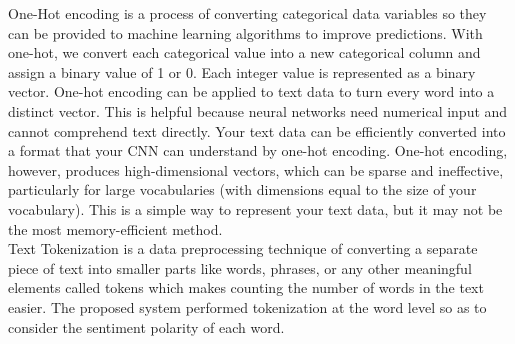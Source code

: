 One-Hot encoding is a process of converting categorical data variables so they can be provided to machine learning algorithms to improve predictions. With one-hot, we convert each categorical value into a new categorical column and assign a binary value of 1 or 0. Each integer value is represented as a binary vector. One-hot encoding can be applied to text data to turn every word into a distinct vector. This is helpful because neural networks need numerical input and cannot comprehend text directly. Your text data can be efficiently converted into a format that your CNN can understand by one-hot encoding.
One-hot encoding, however, produces high-dimensional vectors, which can be sparse and ineffective, particularly for large vocabularies (with dimensions equal to the size of your vocabulary). This is a simple way to represent your text data, but it may not be the most memory-efficient method.
\\

Text Tokenization is a data preprocessing technique of converting a separate piece of text
into smaller parts like words, phrases, or any other meaningful elements called tokens
which makes counting the number of words in the text easier. The proposed system
performed tokenization at the word level so as to consider the sentiment polarity of
each word.
